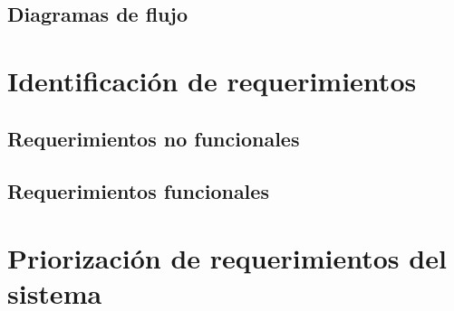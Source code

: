 \subsection{Diagramas de flujo}
%
\newpage%
\section{Identificaci\'on de requerimientos}
\subsection{Requerimientos no funcionales}
%
\newpage%
\subsection{Requerimientos funcionales}
%
\newpage%
\section{Priorizaci\'on de requerimientos del sistema}
